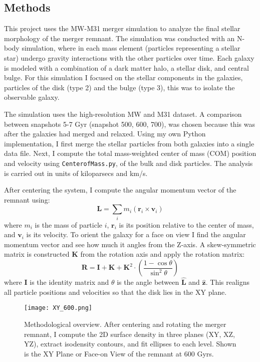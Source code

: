 \documentclass[usenatbib]{mnras}
\begin{document}
\subsection{Methods}

This project uses the \citet{vandermarel12a,vandermarel12b} MW-M31 merger simulation to analyze the final stellar morphology of the merger remnant. The simulation was conducted with an N-body simulation, where in each mass element (particles representing a stellar star) undergo gravity interactions with the other particles over time. Each galaxy is modeled with a combination of a dark matter halo, a stellar disk, and central bulge. For this simulation I focused on the stellar components in the galaxies, particles of the disk (type 2) and the bulge (type 3), this was to isolate the observable galaxy. 

The simulation uses the high-resolution MW and M31 dataset. A comparison between snapshots 5-7 Gyr (snapshot 500, 600, 700), was chosen because this was after the galaxies had merged and relaxed. Using my own Python implementation, I first merge the stellar particles from both galaxies into a single data file. Next, I compute the total mass-weighted center of mass (COM) position and velocity using \texttt{CenterofMass.py}, of the bulk and disk particles. The analysis is carried out in units of kiloparsecs and km/s.

After centering the system, I compute the angular momentum vector of the remnant using:
\[
\mathbf{L} = \sum_i m_i (\mathbf{r}_i \times \mathbf{v}_i)
\]
where \( m_i \) is the mass of particle \( i \), \( \mathbf{r}_i \) is its position relative to the center of mass, and \( \mathbf{v}_i \) is its velocity. To orient the galaxy for a face on view I find the angular momentum vector and see how much it angles from the Z-axis. A skew-symmetric matrix is constructed \( \mathbf{K} \) from the rotation axis and apply the rotation matrix:
\[
\mathbf{R} = \mathbf{I} + \mathbf{K} + \mathbf{K}^2 \cdot \left(\frac{1 - \cos\theta}{\sin^2\theta}\right)
\]
where \( \mathbf{I} \) is the identity matrix and \( \theta \) is the angle between \( \hat{\mathbf{L}} \) and \( \hat{\mathbf{z}} \). This realigns all particle positions and velocities so that the disk lies in the XY plane.


\begin{figure}
    \centering
    \texttt{[image: XY\_600.png]}
    \caption{Methodological overview. After centering and rotating the merger remnant, I compute the 2D surface density in three planes (XY, XZ, YZ), extract isodensity contours, and fit ellipses to each level. Shown is the XY Plane or Face-on View of the remnant at 600 Gyrs.}
    \label{fig:flowchart}
\end{figure}
\end{document}
